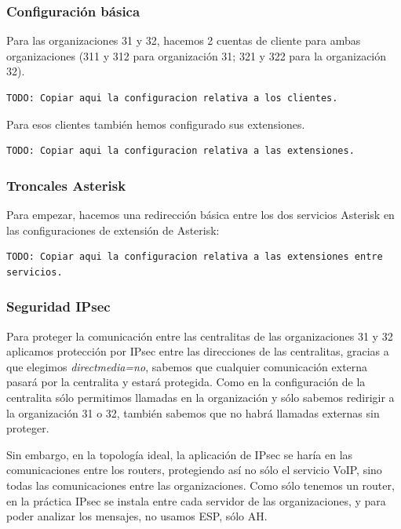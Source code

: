 \documentclass[]{article}
\begin{document}
\subsubsection{Configuración básica}
Para las organizaciones 31 y 32, hacemos 2 cuentas de cliente para ambas organizaciones (311 y 312 para organización 31; 321 y 322 para la organización 32).

\begin{lstlisting}
TODO: Copiar aqui la configuracion relativa a los clientes.
\end{lstlisting}

Para esos clientes también hemos configurado sus extensiones.

\begin{lstlisting}
TODO: Copiar aqui la configuracion relativa a las extensiones.
\end{lstlisting}

\subsubsection{Troncales Asterisk}
Para empezar, hacemos una redirección básica entre los dos servicios Asterisk en las configuraciones de extensión de Asterisk:
\begin{lstlisting}
TODO: Copiar aqui la configuracion relativa a las extensiones entre servicios.
\end{lstlisting}


\subsubsection{Seguridad IPsec}

Para proteger la comunicación entre las centralitas de las organizaciones 31 y 32 aplicamos protección por IPsec entre las direcciones de las centralitas, gracias a que elegimos \textit{directmedia=no}, sabemos que cualquier comunicación externa pasará por la centralita y estará protegida. Como en la configuración de la centralita sólo permitimos llamadas en la organización y sólo sabemos redirigir a la organización 31 o 32, también sabemos que no habrá llamadas externas sin proteger.

Sin embargo, en la topología ideal, la aplicación de IPsec se haría en las comunicaciones entre los routers, protegiendo así no sólo el servicio VoIP, sino todas las comunicaciones entre las organizaciones. Como sólo tenemos un router, en la práctica IPsec se instala entre cada servidor de las organizaciones, y para poder analizar los mensajes, no usamos ESP, sólo AH.
\end{document}
